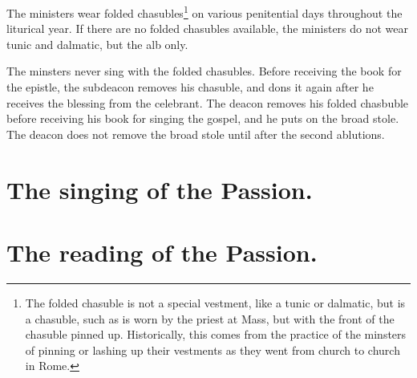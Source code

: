 \documentclass[letterpaper, twocolumn]{article}
\begin{document}
	\rubric The ministers wear folded chasubles\footnote{The folded chasuble is
	not a special vestment, like a tunic or dalmatic, but is a chasuble, such
	as is worn by the priest at Mass, but with the front of the chasuble pinned
	up. Historically, this comes from the practice of the minsters of pinning
	or lashing up their vestments as they went from church to church in Rome.}
	on various penitential days throughout the liturical year. If there are no
	folded chasubles available, the ministers do not wear tunic and dalmatic,
	but the alb only.

	\rubric The minsters never sing with the folded chasubles. Before receiving
	the book for the epistle, the subdeacon removes his chasuble, and dons it
	again after he receives the blessing from the celebrant. The deacon removes
	his folded chasbuble before receiving his book for singing the gospel, and
	he puts on the broad stole. The deacon does not remove the broad stole
	until after the second ablutions.

	\section{The singing of the Passion.}

	\section{The reading of the Passion.}
	
\end{document}
